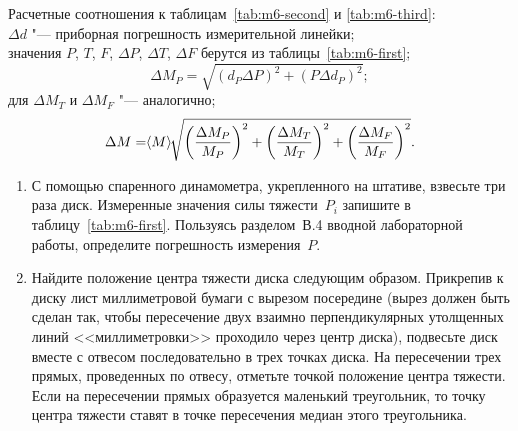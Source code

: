 \documentclass[a4paper, 12pt]{extarticle}
\begin{document}
Расчетные соотношения к таблицам~\ref{tab:m6-second} и \ref{tab:m6-third}: \\
$\Delta d$ "--- приборная погрешность измерительной линейки; \\
значения $P$, $T$, $F$, $\Delta P$, $\Delta T$, $\Delta F$ берутся из таблицы~\ref{tab:m6-first}; \\
\[
\Delta M_P = \sqrt{(d_P \Delta P) ^2 + (P \Delta d_P) ^2};
\]
для $\Delta M_T$ и $\Delta M_F$ "--- аналогично; \\
\begin{equation} %
\label{eq:m6-moment-error}
\Delta M = \MTDMean{M} \sqrt{\left( \frac{\Delta M_P}{M_P} \right) ^2 + \left( \frac{\Delta M_T}{M_T} \right) ^2 + \left( \frac{\Delta M_F}{M_F} \right) ^2 }.
\end{equation}


\begin{enumerate}
\item
С помощью спаренного динамометра, укрепленного на штативе,
взвесьте три раза диск. Измеренные значения силы тяжести~$P_i$ запишите в таблицу~\ref{tab:m6-first}. %
Пользуясь разделом~В.4 вводной лабораторной работы, определите погрешность измерения~$P$.
\item
Найдите положение центра тяжести диска следующим образом.
Прикрепив к диску лист миллиметровой бумаги с вырезом посередине (вырез должен быть сделан так, чтобы пересечение двух взаимно перпендикулярных утолщенных линий <<миллиметровки>> проходило через центр диска), подвесьте диск вместе с отвесом последовательно в трех точках диска. На пересечении трех прямых, проведенных по отвесу, отметьте точкой положение центра тяжести. Если на пересечении прямых образуется маленький треугольник, то точку центра тяжести ставят в точке пересечения медиан этого треугольника.
\end{enumerate}
\end{document}
